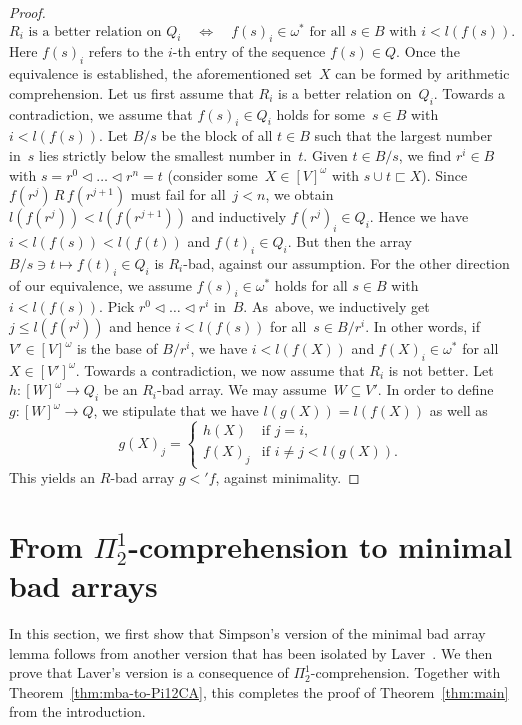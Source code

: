\documentclass{amsart}
\numberwithin{theorem}{section}
\theoremstyle{definition}
\begin{document}
\begin{proof}
\begin{equation*}
\text{$R_i$ is a better relation on~$Q_i$}\quad\Leftrightarrow\quad\text{$f(s)_i\in\omega^*$ for all $s\in B$ with $i<l(f(s))$}.
\end{equation*}
Here $f(s)_i$ refers to the $i$-th entry of the sequence $f(s)\in Q$. Once the equivalence is established, the aforementioned set~$X$ can be formed by arithmetic comprehension. Let us first assume that $R_i$ is a better relation on~$Q_i$. Towards a contradiction, we assume that $f(s)_i\in Q_i$ holds for some~$s\in B$ with $i<l(f(s))$. Let $B/s$ be the block of all $t\in B$ such that the largest number in~$s$ lies strictly below the smallest number in~$t$. Given $t\in B/s$, we find $r^i\in B$ with $s=r^0\vartriangleleft\ldots\vartriangleleft r^n=t$ (consider some~$X\in[V]^\omega$ with $s\cup t\sqsubset X$). Since $f(r^j)\,R\,f(r^{j+1})$ must fail for all~$j<n$, we obtain $l(f(r^j))<l(f(r^{j+1}))$ and inductively $f(r^j)_i\in Q_i$. Hence we have $i<l(f(s))<l(f(t))$ and $f(t)_i\in Q_i$. But then the array $B/s\ni t\mapsto f(t)_i\in Q_i$ is $R_i$-bad, against our assumption. For the other direction of our equivalence, we assume $f(s)_i\in\omega^*$ holds for all $s\in B$ with $i<l(f(s))$. Pick $r^0\vartriangleleft\ldots\vartriangleleft r^i$ in~$B$. As~above, we in\-duc\-tively get $j\leq l(f(r^j))$ and hence $i<l(f(s))$ for all~$s\in B/r^i$. In other words, if~$V'\in[V]^\omega$ is the base of $B/r^i$, we have $i<l(f(X))$ and $f(X)_i\in\omega^*$ for all~$X\in[V']^\omega$. Towards a contradiction, we now assume that $R_i$ is not better. Let $h:[W]^\omega\to Q_i$ be an $R_i$-bad array. We may assume~$W\subseteq V'$. In order to define $g:[W]^\omega\to Q$, we stipulate that we have $l(g(X))=l(f(X))$ as well as
\begin{equation*}
g(X)_j=\begin{cases}
 h(X) & \text{if $j=i$},\\
 f(X)_j & \text{if $i\neq j<l(g(X))$}.
\end{cases}
\end{equation*}
This yields an $R$-bad array $g<'f$, against minimality.
\end{proof}

\section{From $\Pi^1_2$-comprehension to minimal bad arrays}\label{sect:mba-from-Pi12CA}

In this section, we first show that Simpson's version of the minimal bad array lemma follows from another version that has been isolated by Laver~\cite{laver-min-array}. We then prove that Laver's version is a consequence of $\Pi^1_2$-comprehension. Together with Theorem~\ref{thm:mba-to-Pi12CA}, this completes the proof of Theorem~\ref{thm:main} from the introduction.
\end{document}
